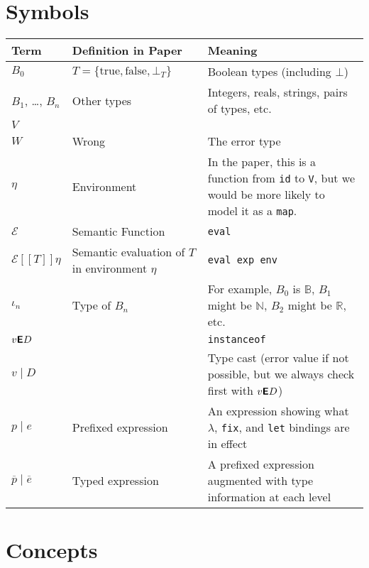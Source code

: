 \documentclass[12pt]{article}
\newcommand{\B}{\mathbb{B}}
\newcommand{\N}{\mathbb{N}}
\newcommand{\R}{\mathbb{R}}
\newcommand{\instanceof}[2]{#1\textsf{\textbf{E}}#2}
\newcommand{\cast}[2]{#1\mid#2}
\newcommand{\pe}[2]{#1\mid#2}
\newcommand{\tpe}[2]{\overline{#1}\mid\overline{#2}}
\begin{document}
\section{Symbols}

\begin{tabular}{l p{} p{}}
\toprule
Term & Definition in Paper & Meaning \\
\midrule
$B_0$ & $T = \{\text{true}, \text{false}, \bot_T\}$ & Boolean types (including $\bot$) \\
$B_1$, \ldots, $B_n$ & Other types & Integers, reals, strings, pairs of types, etc. \\
$V$ &  & \\
$W$ & Wrong & The error type \\
$\eta$ & Environment & In the paper, this is a function from \texttt{id} to \texttt{V}, but we would be more likely to model it as a \texttt{map}.\\
$\mathscr{E}$   & Semantic Function & \texttt{eval} \\
$\mathscr{E}[\![T]\!]\eta$ & Semantic evaluation of $T$ in environment $\eta$ & \texttt{eval exp env} \\
$\iota_n$ & Type of $B_n$ & For example, $B_0$ is $\B$, $B_1$ might be $\N$, $B_2$ might be $\R$, etc. \\
$\instanceof{v}{D}$ & & \texttt{instanceof} \\
$\cast{v}{D}$ & & Type cast (error value if not possible, but we always check first with $\instanceof{v}{D}$) \\

$\pe{p}{e}$ & Prefixed expression & An expression showing what $\lambda$, \texttt{fix}, and \texttt{let} bindings are in effect \\
$\tpe{p}{e}$ & Typed expression &  A prefixed expression augmented with type information at each level \\

\bottomrule
\end{tabular}



\section{Concepts}
\end{document}
